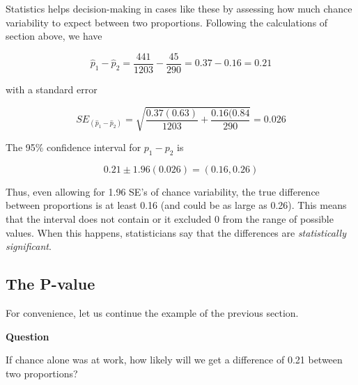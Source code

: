 \documentclass[11pt, chapterprefix=true]{scrbook}\usepackage[]{graphicx}\usepackage[]{color}
\begin{document}
Statistics helps decision-making in cases like these by assessing how much chance variability to expect between two proportions.  Following the calculations of section above, we have

\begin{equation*}
  \hat{p}_1 - \hat{p}_2 = \frac{441}{1203} - \frac{45}{290} = 0.37 - 0.16 = 0.21
\end{equation*}

with a standard error

\begin{equation*}
  SE_{(\hat{p}_1 - \hat{p}_2)} = \sqrt{ \frac{0.37(0.63)}{1203} + \frac{0.16(0.84}{290}} = 0.026
\end{equation*}

The 95\% confidence interval for $p_1 - p_2$ is

\begin{equation*}
0.21 \pm 1.96 (0.026) = (0.16, 0.26)
\end{equation*}

Thus, even allowing for 1.96 SE's of chance variability, the true difference between proportions is at least 0.16 (and could be as large as 0.26).  This means that the interval does not contain or it excluded 0 from the range of possible values.  When this happens, statisticians say that the differences are \textit{statistically significant}.


\subsection{The P-value}

For convenience, let us continue the example of the previous section.

\begin{minipage}[ht]{3cm}

\vspace{-4mm}

\textbf{Question}
\end{minipage}
\begin{minipage}[ht]{12cm}

\parbox{12cm}{
If chance alone was at work, how likely will we get a difference of 0.21 between two proportions?
}
\end{minipage}
\end{document}
